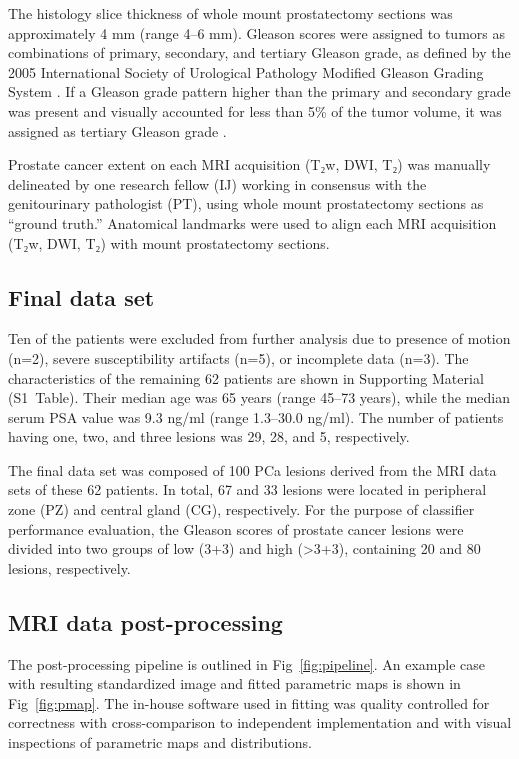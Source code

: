 \documentclass[10pt,letterpaper]{article}
\newcommand{\citep}{\cite}
\begin{document}
The histology slice thickness of whole mount prostatectomy sections was
approximately 4 mm (range 4--6 mm). Gleason scores were assigned to tumors as
combinations of primary, secondary, and tertiary Gleason grade, as defined by
the 2005 International Society of Urological Pathology Modified Gleason Grading
System \citep{Epstein2005}. If a Gleason grade pattern higher than the primary
and secondary grade was present and visually accounted for less than 5\% of the
tumor volume, it was assigned as tertiary Gleason grade \citep{Epstein2010}.

Prostate cancer extent on each MRI acquisition (T₂w, DWI, T₂) was manually
delineated by one research fellow (IJ) working in consensus with the
genitourinary pathologist (PT), using whole mount prostatectomy sections as
``ground truth.'' Anatomical landmarks were used to align each MRI acquisition
(T₂w, DWI, T₂) with mount prostatectomy sections.


\subsection{Final data set}

Ten of the patients were excluded from further analysis due to presence of
motion (n=2), severe susceptibility artifacts (n=5), or incomplete data (n=3).
The characteristics of the remaining 62 patients are shown in Supporting
Material (S1~Table). Their median age was 65 years (range 45--73 years), while
the median serum PSA value was 9.3 ng/ml (range 1.3--30.0 ng/ml). The number of
patients having one, two, and three lesions was 29, 28, and 5, respectively.

The final data set was composed of 100 PCa lesions derived from the MRI data
sets of these 62 patients. In total, 67 and 33 lesions were located in
peripheral zone (PZ) and central gland (CG), respectively. For the purpose of
classifier performance evaluation, the Gleason scores of prostate cancer lesions
were divided into two groups of low (3+3) and high (>3+3), containing 20 and 80
lesions, respectively.


\subsection{MRI data post-processing}

The post-processing pipeline is outlined in Fig~\ref{fig:pipeline}. An
example case with resulting standardized image and fitted parametric maps is
shown in Fig~\ref{fig:pmap}. The in-house software used in fitting was
quality controlled for correctness with cross-comparison to independent
implementation and with visual inspections of parametric maps and distributions.
\end{document}
